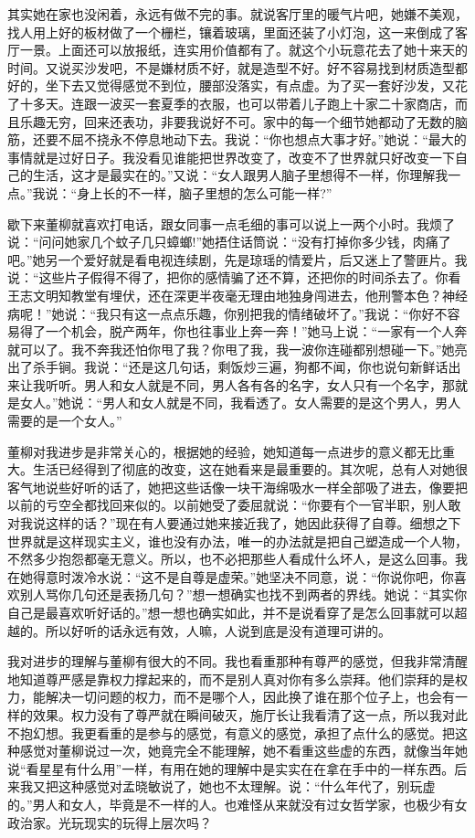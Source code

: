\documentclass[12pt,oneside]{book}
\begin{document}
其实她在家也没闲着，永远有做不完的事。就说客厅里的暖气片吧，她嫌不美观，找人用上好的板材做了一个栅栏，镶着玻璃，里面还装了小灯泡，这一来倒成了客厅一景。上面还可以放报纸，连实用价值都有了。就这个小玩意花去了她十来天的时间。又说买沙发吧，不是嫌材质不好，就是造型不好。好不容易找到材质造型都好的，坐下去又觉得感觉不到位，腰部没落实，有点虚。为了买一套好沙发，又花了十多天。连跟一波买一套夏季的衣服，也可以带着儿子跑上十家二十家商店，而且乐趣无穷，回来还表功，非要我说好不可。家中的每一个细节她都动了无数的脑筋，还要不屈不挠永不停息地动下去。我说：``你也想点大事才好。''她说：``最大的事情就是过好日子。我没看见谁能把世界改变了，改变不了世界就只好改变一下自己的生活，这才是最实在的。''又说：``女人跟男人脑子里想得不一样，你理解我一点。''我说：``身上长的不一样，脑子里想的怎么可能一样?''

歇下来董柳就喜欢打电话，跟女同事一点毛细的事可以说上一两个小时。我烦了说：``问问她家几个蚊子几只蟑螂!''她捂住话筒说：``没有打掉你多少钱，肉痛了吧。''她另一个爱好就是看电视连续剧，先是琼瑶的情爱片，后又迷上了警匪片。我说：``这些片子假得不得了，把你的感情骗了还不算，还把你的时间杀去了。你看王志文明知教堂有埋伏，还在深更半夜毫无理由地独身闯进去，他刑警本色？神经病呢！''她说：``我只有这一点点乐趣，你别把我的情绪破坏了。''我说：``你好不容易得了一个机会，脱产两年，你也往事业上奔一奔！''她马上说：``一家有一个人奔就可以了。我不奔我还怕你甩了我？你甩了我，我一波你连碰都别想碰一下。''她亮出了杀手锏。我说：``还是这几句话，剩饭炒三遍，狗都不闻，你也说句新鲜话出来让我听听。男人和女人就是不同，男人各有各的名字，女人只有一个名字，那就是女人。''她说：``男人和女人就是不同，我看透了。女人需要的是这个男人，男人需要的是一个女人。''

董柳对我进步是非常关心的，根据她的经验，她知道每一点进步的意义都无比重大。生活已经得到了彻底的改变，这在她看来是最重要的。其次呢，总有人对她很客气地说些好听的话了，她把这些话像一块干海绵吸水一样全部吸了进去，像要把以前的亏空全都找回来似的。以前她受了委屈就说：``你要有个一官半职，别人敢对我说这样的话？''现在有人要通过她来接近我了，她因此获得了自尊。细想之下世界就是这样现实主义，谁也没有办法，唯一的办法就是把自己塑造成一个人物，不然多少抱怨都毫无意义。所以，也不必把那些人看成什么坏人，是这么回事。我在她得意时泼冷水说：``这不是自尊是虚荣。''她坚决不同意，说：``你说你吧，你喜欢别人骂你几句还是表扬几句？''想一想确实也找不到两者的界线。她说：``其实你自己是最喜欢听好话的。''想一想也确实如此，并不是说看穿了是怎么回事就可以超越的。所以好听的话永远有效，人嘛，人说到底是没有道理可讲的。

我对进步的理解与董柳有很大的不同。我也看重那种有尊严的感觉，但我非常清醒地知道尊严感是靠权力撑起来的，而不是别人真对你有多么崇拜。他们崇拜的是权力，能解决一切问题的权力，而不是哪个人，因此换了谁在那个位子上，也会有一样的效果。权力没有了尊严就在瞬间破灭，施厅长让我看清了这一点，所以我对此不抱幻想。我更看重的是参与的感觉，有意义的感觉，承担了点什么的感觉。把这种感觉对董柳说过一次，她竟完全不能理解，她不看重这些虚的东西，就像当年她说``看星星有什么用''一样，有用在她的理解中是实实在在拿在手中的一样东西。后来我又把这种感觉对孟晓敏说了，她也不太理解。说：``什么年代了，别玩虚的。''男人和女人，毕竟是不一样的人。也难怪从来就没有过女哲学家，也极少有女政治家。光玩现实的玩得上层次吗？
\end{document}
